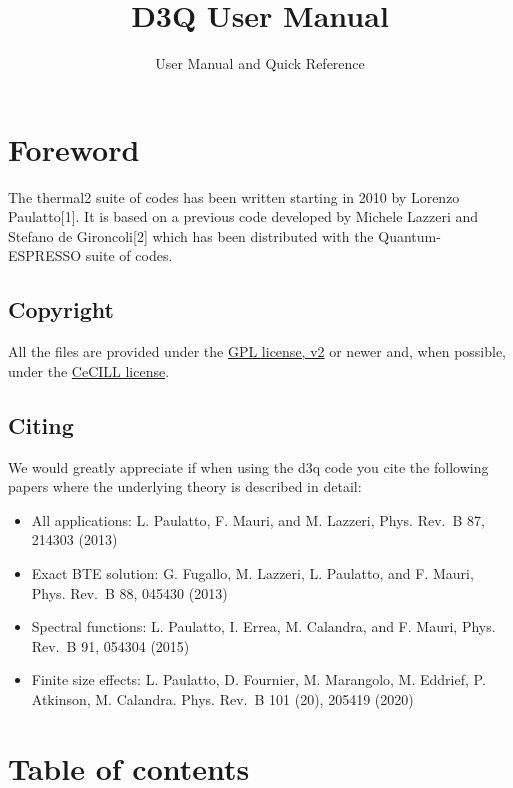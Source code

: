 \documentclass[
]{article}
\title{D3Q User Manual}
\subtitle{User Manual and Quick Reference}
\author{}
\date{}
\providecommand{\tightlist}{%
  \setlength{\itemsep}{0pt}\setlength{\parskip}{0pt}}
\begin{document}
\begin{titlepage}

\end{titlepage}

{
\setcounter{tocdepth}{3}
\tableofcontents
}
\hypertarget{foreword}{%
\section{Foreword}\label{foreword}}

The thermal2 suite of codes has been written starting in 2010 by Lorenzo
Paulatto{[}1{]}. It is based on a previous code developed by Michele
Lazzeri and Stefano de Gironcoli{[}2{]} which has been distributed with
the Quantum-ESPRESSO suite of codes.

\hypertarget{copyright}{%
\subsection{Copyright}\label{copyright}}

All the files are provided under the
\href{https://www.gnu.org/licenses/old-licenses/gpl-2.0.en.html}{GPL
license, v2} or newer and, when possible, under the
\href{https://cecill.info/licences/Licence_CeCILL_V2.1-fr.html}{CeCILL
license}.

\hypertarget{citing}{%
\subsection{Citing}\label{citing}}

We would greatly appreciate if when using the d3q code you cite the
following papers where the underlying theory is described in detail:

\begin{itemize}
\tightlist
\item
  All applications: L. Paulatto, F. Mauri, and M. Lazzeri, Phys. Rev.~B
  87, 214303 (2013)
\item
  Exact BTE solution: G. Fugallo, M. Lazzeri, L. Paulatto, and F. Mauri,
  Phys. Rev.~B 88, 045430 (2013)
\item
  Spectral functions: L. Paulatto, I. Errea, M. Calandra, and F. Mauri,
  Phys. Rev.~B 91, 054304 (2015)
\item
  Finite size effects: L. Paulatto, D. Fournier, M. Marangolo, M.
  Eddrief, P. Atkinson, M. Calandra. Phys. Rev.~B 101 (20), 205419
  (2020)
\end{itemize}

\hypertarget{table-of-contents}{%
\section{Table of contents}\label{table-of-contents}}
\end{document}
